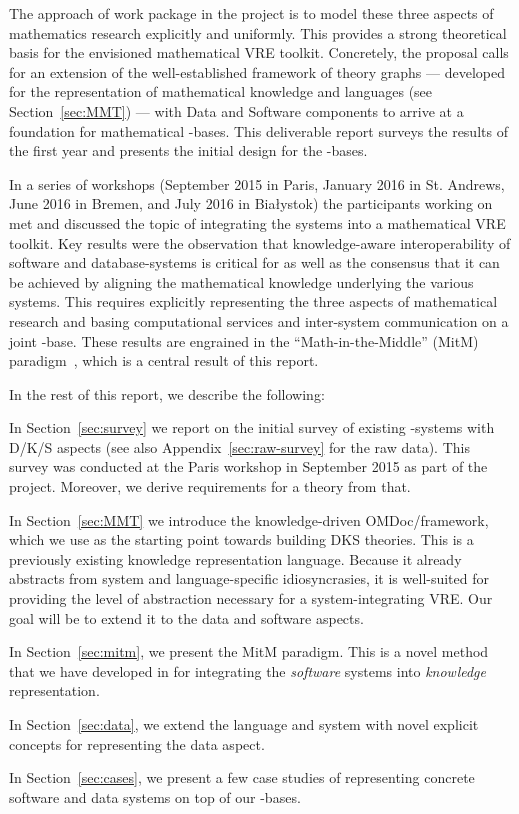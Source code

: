 The approach of work package  in the \pn project is to model these three
aspects of mathematics research explicitly and uniformly.
This provides a strong theoretical basis for the envisioned mathematical
VRE toolkit. Concretely, the \pn proposal calls for an extension of the well-established
framework of theory graphs --- developed for the representation of mathematical knowledge
and languages (see Section~\ref{sec:MMT}) --- with Data and Software components to arrive
at a foundation for mathematical \DKS-bases. This deliverable report surveys
the results of the first year and presents the initial design for the
\DKS-bases.

In a series of workshops (September 2015 in Paris, January 2016 in St. Andrews, June 2016
in Bremen, and July 2016 in Bia{\l}ystok) the participants working on  met
and discussed the topic of integrating the \pn systems into a mathematical VRE toolkit.
Key results were the observation that knowledge-aware interoperability of software and database-systems is critical
for \pn as well as the consensus that it can be achieved by aligning the mathematical knowledge underlying
the various systems.
This requires explicitly representing the three aspects of mathematical research and basing
computational services and inter-system communication on a joint \DKS-base.
These results are engrained in the ``Math-in-the-Middle'' (MitM)
paradigm~\cite{DehKohKon:iop16}, which is a central result of this report.

In the rest of this report, we describe the following:
\begin{compactenum}
\item In Section~\ref{sec:survey} we report on the initial survey of existing \pn-systems with
D/K/S aspects (see also Appendix~\ref{sec:raw-survey} for the raw data).
This survey was conducted at the Paris workshop in September 2015 as part of the \pn project.
Moreover, we derive requirements for a \DKS theory from that.
\item In Section~\ref{sec:MMT} we introduce the knowledge-driven OMDoc/\MMT framework, which we use as the
  starting point towards building DKS theories.
  This is a previously existing knowledge representation language.
  Because it already abstracts from system and language-specific idiosyncrasies, it is well-suited for providing the level of abstraction necessary for a system-integrating VRE.
  Our goal will be to extend it to the data and software aspects.
\item In Section~\ref{sec:mitm}, we present the MitM paradigm.
  This is a novel method that we have developed in \pn for integrating the \emph{software} systems into \emph{knowledge} representation.
\item In Section~\ref{sec:data}, we extend the \MMT language and system with novel explicit concepts for representing the data aspect.
\item In Section~\ref{sec:cases}, we present a few case studies of representing concrete software and data systems on top of our \DKS-bases.
\end{compactenum}

